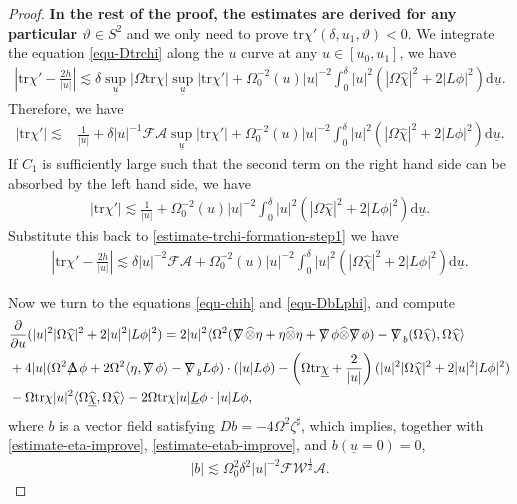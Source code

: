 \documentclass[11pt,reqno]{amsart}
\theoremstyle{definition}
\numberwithin{equation}{section}
\newcommand{\D}{\mathrm{d}}
\newcommand{\tr}{\mathrm{tr}}
\def\chib{\underline{\chi}}
\def\chibh{\widehat{\underline{\chi}}}
\def\chih{\widehat{\chi}}
\def\Lb{\underline{L}}
\def\tr{\mathrm{tr}}
\def\tensor{\widehat{\otimes}}
\def\ub{\underline{u}}
\def\nablas{\mbox{$\nabla \mkern -13mu /$ }}
\def\Deltas{\mbox{$\Delta \mkern -13mu /$ }}
\def\ds{\mbox{$\nabla \mkern -13mu /$ }}
\begin{document}
\begin{proof}
{\bf In the rest of the proof,  the estimates are derived for any particular $\vartheta\in S^2$} and we only need to prove $\tr\chi'(\delta,u_1,\vartheta)<0$. We integrate the equation \eqref{equ-Dtrchi} along the $u$ curve at any $u\in[u_0,u_1]$, we have
\begin{align}\label{estimate-trchi-formation-step1}
\left|\tr\chi'-\frac{2h}{|u|}\right|\lesssim\delta\sup_{\ub}|\Omega\tr\chi|\sup_{\ub}|\tr\chi'|+\Omega_0^{-2}(u)|u|^{-2}\int_0^{\delta}|u|^2(|\Omega\chih|^2+2|L\phi|^2)\D\ub.
\end{align}
Therefore, we have
\begin{align*}
|\tr\chi'|\lesssim&\frac{1}{|u|}+\delta|u|^{-1}\mathscr{F}\mathcal{A}\sup_{\ub}|\tr\chi'|+\Omega_0^{-2}(u)|u|^{-2}\int_0^{\delta}|u|^2(|\Omega\chih|^2+2|L\phi|^2)\D\ub.
\end{align*}
If $C_1$ is sufficiently large such that the second term on the right hand side can be absorbed by the left hand side, we have
\begin{align}\label{estimate-trchi-formation}
|\tr\chi'|\lesssim\frac{1}{|u|}+\Omega_0^{-2}(u)|u|^{-2}\int_0^{\delta}|u|^2(|\Omega\chih|^2+2|L\phi|^2)\D\ub.
\end{align}
Substitute this back to \eqref{estimate-trchi-formation-step1} we have
\begin{align}\label{estimate-trchi-2h/|u|-formation}
\left|\tr\chi'-\frac{2h}{|u|}\right|\lesssim\delta|u|^{-2}\mathscr{F}\mathcal{A}+\Omega_0^{-2}(u)|u|^{-2}\int_0^{\delta}|u|^2(|\Omega\chih|^2+2|L\phi|^2)\D\ub.
\end{align}

Now we turn to the equations \eqref{equ-chih} and \eqref{equ-DbLphi}, and compute
\begin{equation}\label{equ-Dbchih2}
\begin{split}
&\frac{\partial}{\partial u}(|u|^2|\Omega\chih|^2+2|u|^2|L\phi|^2)
=2|u|^2\langle\Omega^2(\nablas\tensor\eta+\eta\tensor\eta+\nablas\phi\tensor\nablas\phi)-\nablas_b(\Omega\chih),\Omega\chih\rangle\\
&+4|u|(\Omega^2\Deltas\phi+2\Omega^2\langle\eta,\ds\phi\rangle-\nablas_bL\phi)\cdot(|u|L\phi)
-\left(\Omega\tr\chib+\frac{2}{|u|}\right)(|u|^2|\Omega\chih|^2+2|u|^2|L\phi|^2)\\
&-\Omega\tr\chi|u|^2\langle\Omega\chibh,\Omega\chih\rangle-2\Omega\tr\chi|u|\Lb\phi\cdot|u|L\phi,
\end{split}
\end{equation}
where $b$ is a vector field satisfying $D b=-4\Omega^2\zeta^\sharp$, which implies, together with \eqref{estimate-eta-improve}, \eqref{estimate-etab-improve}, and $b(\ub=0)=0$,
\begin{align}\label{estimate-b}
|b|\lesssim\Omega_0^2\delta^2|u|^{-2}\mathscr{F}\mathscr{W}^{\frac{1}{2}}\mathcal{A}.
\end{align}


\end{proof}
\end{document}
